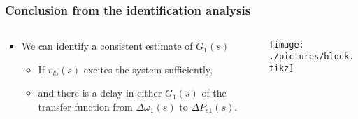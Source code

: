 \begin{frame}
	\frametitle{Conclusion from the identification analysis}
	\begin{columns}
		\begin{column}{0.3\textwidth}
			\begin{itemize}[<+->]
					\item We can identify a consistent estimate of $G_1(s)$
						\begin{itemize}
							\item If $v_{l5}(s)$ excites the system sufficiently,
							\item and there is a delay in either $G_1(s)$ of the transfer function from $\Delta \omega_1(s)$ to $\Delta P_{e1}(s)$.
						\end{itemize}
			\end{itemize}
		\end{column}
		\begin{column}{0.7\textwidth}
				\texttt{[image: ./pictures/block.tikz]}
		\end{column}
	\end{columns}
\end{frame}


